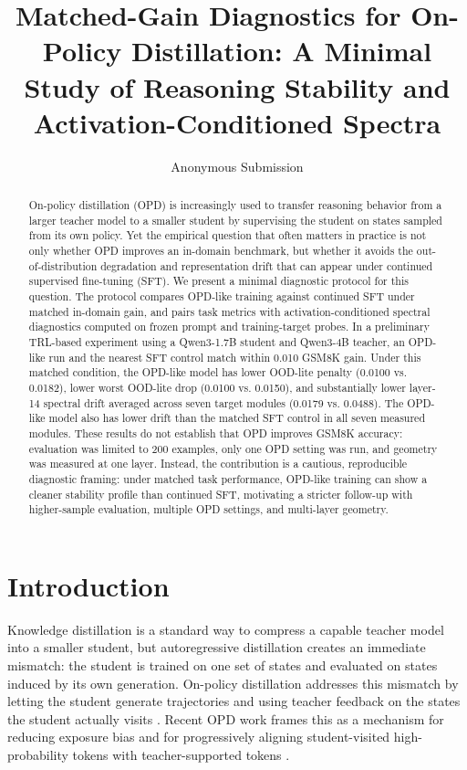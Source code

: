 \documentclass[letterpaper]{article}
\title{Matched-Gain Diagnostics for On-Policy Distillation: A Minimal Study of Reasoning Stability and Activation-Conditioned Spectra}
\author{
Anonymous Submission
}
\begin{document}
\maketitle

\begin{abstract}
On-policy distillation (OPD) is increasingly used to transfer reasoning behavior from a larger teacher model to a smaller student by supervising the student on states sampled from its own policy.
Yet the empirical question that often matters in practice is not only whether OPD improves an in-domain benchmark, but whether it avoids the out-of-distribution degradation and representation drift that can appear under continued supervised fine-tuning (SFT).
We present a minimal diagnostic protocol for this question.
The protocol compares OPD-like training against continued SFT under matched in-domain gain, and pairs task metrics with activation-conditioned spectral diagnostics computed on frozen prompt and training-target probes.
In a preliminary TRL-based experiment using a Qwen3-1.7B student and Qwen3-4B teacher, an OPD-like run and the nearest SFT control match within 0.010 GSM8K gain.
Under this matched condition, the OPD-like model has lower OOD-lite penalty (0.0100 vs. 0.0182), lower worst OOD-lite drop (0.0100 vs. 0.0150), and substantially lower layer-14 spectral drift averaged across seven target modules (0.0179 vs. 0.0488).
The OPD-like model also has lower drift than the matched SFT control in all seven measured modules.
These results do not establish that OPD improves GSM8K accuracy: evaluation was limited to 200 examples, only one OPD setting was run, and geometry was measured at one layer.
Instead, the contribution is a cautious, reproducible diagnostic framing: under matched task performance, OPD-like training can show a cleaner stability profile than continued SFT, motivating a stricter follow-up with higher-sample evaluation, multiple OPD settings, and multi-layer geometry.
\end{abstract}

\section{Introduction}

Knowledge distillation is a standard way to compress a capable teacher model into a smaller student, but autoregressive distillation creates an immediate mismatch: the student is trained on one set of states and evaluated on states induced by its own generation.
On-policy distillation addresses this mismatch by letting the student generate trajectories and using teacher feedback on the states the student actually visits \citep{agarwal2024gkd}.
Recent OPD work frames this as a mechanism for reducing exposure bias and for progressively aligning student-visited high-probability tokens with teacher-supported tokens \citep{li2026rethinkingopd,song2026surveyopd}.
\end{document}
